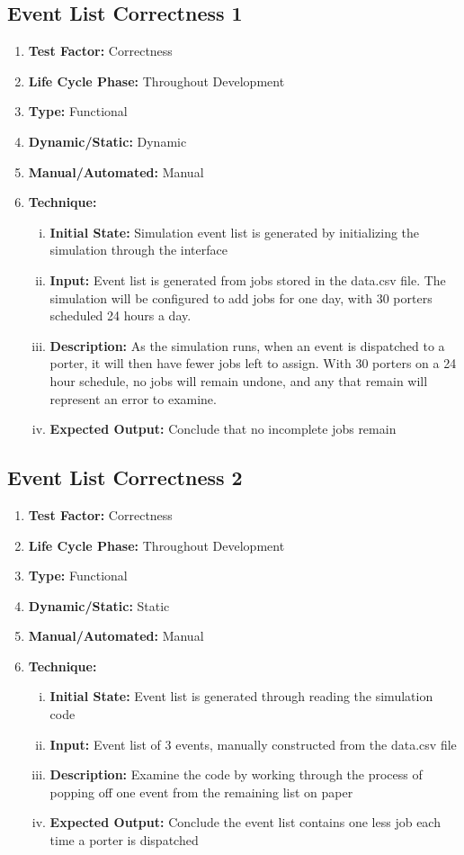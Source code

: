 \documentclass[paper=letter, fontsize=10pt]{scrartcl}
\numberwithin{equation}{section}		%
\numberwithin{figure}{section}			%
\numberwithin{table}{section}				%
\begin{document}
\subsection{Event List Correctness 1}
\begin{enumerate}[]
	\item \textbf{Test Factor:} Correctness
	\item \textbf{Life Cycle Phase:} Throughout Development
	\item \textbf{Type:} Functional
	\item \textbf{Dynamic/Static:} Dynamic
	\item \textbf{Manual/Automated:} Manual
	\item \textbf{Technique:} 
		\begin{enumerate}[(i)]
			\item \textbf{Initial State:} Simulation event list is generated by initializing the simulation through the interface		
			\item \textbf{Input:} Event list is generated from jobs stored in the data.csv file. The simulation will be configured to add jobs for one day, with 30 porters scheduled 24 hours a day.
			\item \textbf{Description:} As the simulation runs, when an event is dispatched to a porter, it will then have fewer jobs left to assign. With 30 porters on a 24 hour schedule, no jobs will remain undone, and any that remain will represent an error to examine.
			\item \textbf{Expected Output:} Conclude that no incomplete jobs remain
		\end{enumerate}
\end{enumerate}

\subsection{Event List Correctness 2}
\begin{enumerate}[]
	\item \textbf{Test Factor:} Correctness
	\item \textbf{Life Cycle Phase:} Throughout Development
	\item \textbf{Type:} Functional
	\item \textbf{Dynamic/Static:} Static
	\item \textbf{Manual/Automated:} Manual
	\item \textbf{Technique:} 
		\begin{enumerate}[(i)]
			\item \textbf{Initial State:} Event list is generated through reading the simulation code			
			\item \textbf{Input:} Event list of 3 events, manually constructed from the data.csv file
			\item \textbf{Description:} Examine the code by working through the process of popping off one event from the remaining list on paper
			\item \textbf{Expected Output:} Conclude the event list contains one less job each time a porter is dispatched
		\end{enumerate}
\end{enumerate}
\end{document}

